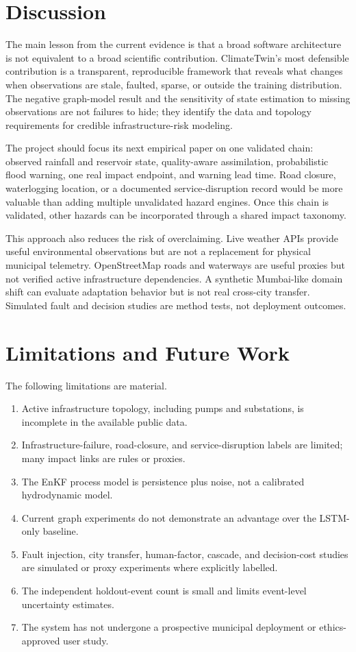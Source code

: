 \documentclass[journal]{IEEEtran}
\begin{document}
\section{Discussion}
The main lesson from the current evidence is that a broad software architecture is not equivalent to a broad scientific contribution. ClimateTwin's most defensible contribution is a transparent, reproducible framework that reveals what changes when observations are stale, faulted, sparse, or outside the training distribution. The negative graph-model result and the sensitivity of state estimation to missing observations are not failures to hide; they identify the data and topology requirements for credible infrastructure-risk modeling.

The project should focus its next empirical paper on one validated chain: observed rainfall and reservoir state, quality-aware assimilation, probabilistic flood warning, one real impact endpoint, and warning lead time. Road closure, waterlogging location, or a documented service-disruption record would be more valuable than adding multiple unvalidated hazard engines. Once this chain is validated, other hazards can be incorporated through a shared impact taxonomy.

This approach also reduces the risk of overclaiming. Live weather APIs provide useful environmental observations but are not a replacement for physical municipal telemetry. OpenStreetMap roads and waterways are useful proxies but not verified active infrastructure dependencies. A synthetic Mumbai-like domain shift can evaluate adaptation behavior but is not real cross-city transfer. Simulated fault and decision studies are method tests, not deployment outcomes.

\section{Limitations and Future Work}
The following limitations are material.
\begin{enumerate}
\item Active infrastructure topology, including pumps and substations, is incomplete in the available public data.
\item Infrastructure-failure, road-closure, and service-disruption labels are limited; many impact links are rules or proxies.
\item The EnKF process model is persistence plus noise, not a calibrated hydrodynamic model.
\item Current graph experiments do not demonstrate an advantage over the LSTM-only baseline.
\item Fault injection, city transfer, human-factor, cascade, and decision-cost studies are simulated or proxy experiments where explicitly labelled.
\item The independent holdout-event count is small and limits event-level uncertainty estimates.
\item The system has not undergone a prospective municipal deployment or ethics-approved user study.
\end{enumerate}
\end{document}
